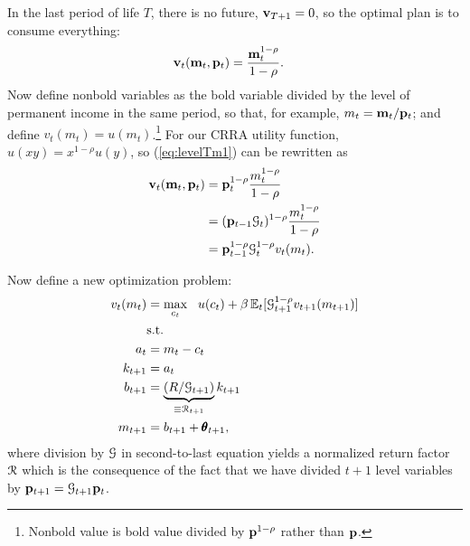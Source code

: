 \documentclass[titlepage, headings=optiontotocandhead]{Resources/texmf-local/tex/latex/econtex}
\begin{document}
In the last {period} of life $T$, there is no future, $\mathbf{v}_{T+1} = 0$, so the optimal plan is to consume everything:
\begin{equation}\begin{gathered}\begin{aligned}
      \mathbf{v}_{t}(\mathbf{m}_{t},\mathbf{p}_{t})  & = \frac{\mathbf{m}_{t}^{1-\rho}}{1-\rho}. \label{eq:levelTm1}
    \end{aligned}\end{gathered}\end{equation}
Now define nonbold variables as the bold variable divided by the level of permanent income in the same period, so that, for example, $m_{t}=\mathbf{m}_{t}/\mathbf{p}_{t}$; and define $v_{t}(m_{t}) = u(m_{t})$.\footnote{Nonbold value is bold value divided by $\mathbf{p}^{1-\rho}$ rather than $\mathbf{p}$.}  For our CRRA utility function, $u(xy)=x^{1-\rho}u(y)$, so (\ref{eq:levelTm1}) can be rewritten as
\begin{equation}\begin{gathered}\begin{aligned}
      \mathbf{v}_{t}(\mathbf{m}_{t},\mathbf{p}_{t}) & = \mathbf{p}_{t}^{1-\rho}\frac{{m}_{t}^{1-\rho}}{1-\rho}                       \\
                                                & = (\mathbf{p}_{t-1}\mathcal{G}_{t})^{1-\rho}\frac{{m}_{t}^{1-\rho}}{1-\rho} \\
                                                &= \mathbf{p}_{t-1}^{1-\rho}\mathcal{G}_{t}^{1-\rho}v_{t}(m_{t}). \label{eq:vT}
    \end{aligned}\end{gathered}\end{equation}

Now define a new optimization problem:
  \begin{equation}\begin{gathered}\begin{aligned}
        v_{t}(m_{t}) & = \max_{{c}_{t}} ~~ u(c_{t})+{\beta}\operatorname{\mathbb{E}}_{t}[ \mathcal{G}_{t+1}^{1-\rho}v_{t+1}(m_{t+1})] \label{eq:vNormed}                   \\
                                         & \text{s.t.}                                                                                 \\
        a_{t}                       & = m_{t}-c_{t}                                                                     \\
        {k}_{t+1}                     & = a_{t}                                                                                \\
        b_{t+1}                     & = \underbrace{\left(R/\mathcal{G}_{t+1}\right)}_{\equiv \mathcal{R}_{t+1}}{k}_{t+1} \\
        m_{t+1}                        & = b_{t+1}+\pmb{\theta}_{t+1},
      \end{aligned}\end{gathered}\end{equation}
where division by $\mathcal{G}$ in second-to-last equation yields a normalized return factor $\mathcal{R}$ which is the consequence of the fact that we have divided $t+1$ level variables by $\mathbf{p}_{t+1}=\mathcal{G}_{t+1}\mathbf{p}_{t}$.
\end{document}

